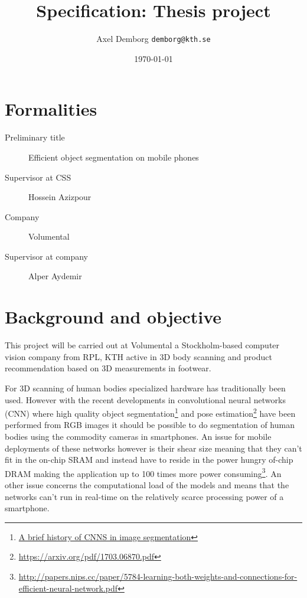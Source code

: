 \documentclass[11pt]{article}
\author{Axel Demborg \texttt{demborg@kth.se}}
\date{\today}
\title{Specification: Thesis project}
\begin{document}
\maketitle

\section{Formalities}
\label{sec:orgc0aa9f1}
\begin{description}
\item[{Preliminary title}] Efficient object segmentation on mobile phones
\item[{Supervisor at CSS}] Hossein Azizpour
\item[{Company}] Volumental
\item[{Supervisor at company}] Alper Aydemir
\end{description}

\section{Background and objective}
\label{sec:org4331d32}
This project will be carried out at Volumental a Stockholm-based computer vision company from RPL, KTH active in 3D body scanning and product recommendation based on 3D measurements in footwear.

For 3D scanning of human bodies specialized hardware has traditionally been used. However with the recent developments in convolutional neural networks (CNN) where high quality object segmentation\footnote{\href{https://blog.athelas.com/a-brief-history-of-cnns-in-image-segmentation-from-r-cnn-to-mask-r-cnn-34ea83205de4}{A brief history of CNNS in image segmentation}} and pose estimation\footnote{\url{https://arxiv.org/pdf/1703.06870.pdf}} have been performed from RGB images it should be possible to do segmentation of human bodies using the commodity cameras in smartphones. An issue for mobile deployments of these networks however is their shear size meaning that they can't fit in the on-chip SRAM and instead have to reside in the power hungry of-chip DRAM making the application up to 100 times more power consuming\footnote{\url{http://papers.nips.cc/paper/5784-learning-both-weights-and-connections-for-efficient-neural-network.pdf}}. An other issue concerns the computational load of the models and means that the networks can't run in real-time on the relatively scarce processing power of a smartphone.
\end{document}
